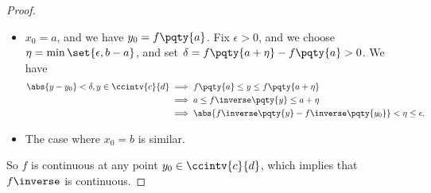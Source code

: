 \begin{proof}
\begin{itemize}
        \item \(x_0 = a\), and we have \(y_0 = f\pqty{a}\). Fix \(\epsilon > 0\), and we choose \(\eta = \min\set{\epsilon, b - a}\), and set \(\delta = f\pqty{a + \eta} - f\pqty{a} > 0\). We have
        \begin{align*}
            \abs{y - y_0} < \delta, y \in \ccintv{c}{d} &\implies f\pqty{a} \leq y \leq f\pqty{a + \eta} \\
            &\implies a \leq f\inverse\pqty{y} \leq a + \eta \\
            &\implies \abs{f\inverse\pqty{y} - f\inverse\pqty{y_0}} < \eta \leq \epsilon.
        \end{align*}

        \item The case where \(x_0 = b\) is similar.
    \end{itemize}

    So \(f\) is continuous at any point \(y_0 \in \ccintv{c}{d}\), which implies that \(f\inverse\) is continuous.
\end{proof}